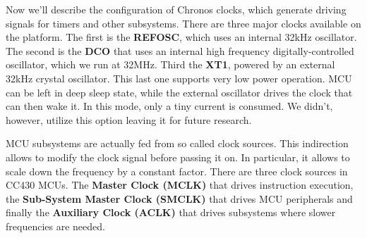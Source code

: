 Now we'll describe the configuration of Chronos clocks, which generate driving signals for timers and other subsystems. There are three major clocks available on the platform. The first is the {\bf REFOSC}, which uses an internal 32kHz oscillator. The second is the {\bf DCO} that uses an internal high frequency digitally-controlled oscillator, which we run at 32MHz. Third the {\bf XT1}, powered by an external 32kHz crystal oscillator. This last one supports very low power operation. MCU can be left in deep sleep state, while the external oscillator drives the clock that can then wake it. In this mode, only a tiny current is consumed. We didn't, however, utilize this option leaving it for future research.

MCU subsystems are actually fed from so called clock sources. This indirection allows to modify the clock signal before passing it on. In particular, it allows to scale down the frequency by a constant factor. There are three clock sources in CC430 MCUs. The {\bf Master Clock (MCLK)} that drives instruction execution, the {\bf Sub-System Master Clock (SMCLK)} that drives MCU peripherals and finally the {\bf Auxiliary Clock (ACLK)} that drives subsystems where slower frequencies are needed.

